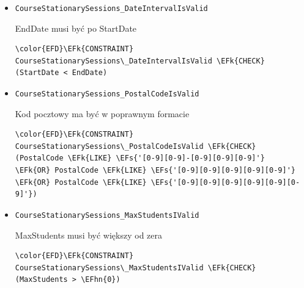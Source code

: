 \documentclass[11pt]{article}
\newcommand{\EFs}[1]{\textcolor{EFs}{#1}} %
\newcommand{\EFk}[1]{\textcolor{EFk}{\textbf{#1}}} %
\newcommand{\EFhn}[1]{\textcolor{EFhn}{#1}} %
\begin{document}
\begin{itemize}
\item \texttt{CourseStationarySessions\_DateIntervalIsValid}

EndDate musi być po StartDate
\begin{Code}
\begin{Verbatim}
\color{EFD}\EFk{CONSTRAINT} CourseStationarySessions\_DateIntervalIsValid \EFk{CHECK}
(StartDate < EndDate)
\end{Verbatim}
\end{Code}
\item \texttt{CourseStationarySessions\_PostalCodeIsValid}

Kod pocztowy ma być w poprawnym formacie
\begin{Code}
\begin{Verbatim}
\color{EFD}\EFk{CONSTRAINT} CourseStationarySessions\_PostalCodeIsValid \EFk{CHECK}
(PostalCode \EFk{LIKE} \EFs{'[0-9][0-9]-[0-9][0-9][0-9]'}
\EFk{OR} PostalCode \EFk{LIKE} \EFs{'[0-9][0-9][0-9][0-9][0-9]'}
\EFk{OR} PostalCode \EFk{LIKE} \EFs{'[0-9][0-9][0-9][0-9][0-9][0-9]'})
\end{Verbatim}
\end{Code}
\item \texttt{CourseStationarySessions\_MaxStudentsIValid}

MaxStudents musi być większy od zera
\begin{Code}
\begin{Verbatim}
\color{EFD}\EFk{CONSTRAINT} CourseStationarySessions\_MaxStudentsIValid \EFk{CHECK}
(MaxStudents > \EFhn{0})
\end{Verbatim}
\end{Code}
\end{itemize}
\end{document}
